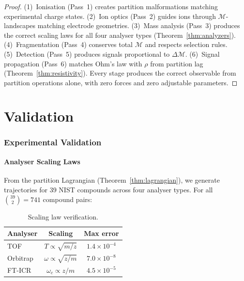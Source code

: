 \documentclass[11pt,twocolumn,a4paper]{article}
\theoremstyle{definition}
\theoremstyle{remark}
\newcommand{\Depth}{\mathcal{M}}
\begin{document}
\begin{proof}
(1)~Ionisation (Pass~1) creates partition malformations matching experimental charge states. (2)~Ion optics (Pass~2) guides ions through $\Depth$-landscapes matching electrode geometries. (3)~Mass analysis (Pass~3) produces the correct scaling laws for all four analyser types (Theorem~\ref{thm:analyzers}). (4)~Fragmentation (Pass~4) conserves total $\Depth$ and respects selection rules. (5)~Detection (Pass~5) produces signals proportional to $\Delta\Depth$. (6)~Signal propagation (Pass~6) matches Ohm's law with $\rho$ from partition lag (Theorem~\ref{thm:resistivity}). Every stage produces the correct observable from partition operations alone, with zero forces and zero adjustable parameters.
\end{proof}


\part{Validation}

\section{Experimental Validation}
\label{sec:validation}

\subsection{Analyser Scaling Laws}

From the partition Lagrangian (Theorem~\ref{thm:lagrangian}), we generate trajectories for 39 NIST compounds \citep{johnson2022} across four analyser types. For all $\binom{39}{2} = 741$ compound pairs:

\begin{table}[H]
\centering
\caption{Scaling law verification.}
\small
\begin{tabular}{lcc}
\toprule
\textbf{Analyser} & \textbf{Scaling} & \textbf{Max error} \\
\midrule
TOF & $T \propto \sqrt{m/z}$ & $1.4 \times 10^{-4}$ \\
Orbitrap & $\omega \propto \sqrt{z/m}$ & $7.0 \times 10^{-8}$ \\
FT-ICR & $\omega_c \propto z/m$ & $4.5 \times 10^{-5}$ \\
\bottomrule
\end{tabular}
\end{table}
\end{document}
